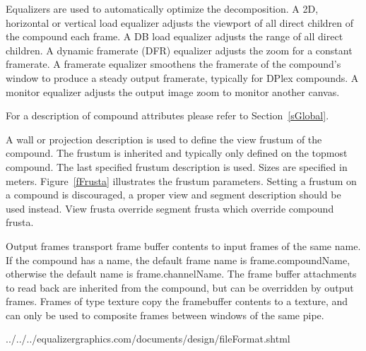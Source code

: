 \documentclass[10pt,a4]{scrartcl}
\newcommand{\fig}[1]{Figure~\ref{#1}}
\newcommand{\sref}[1]{Section~\ref{#1}}
\begin{document}
Equalizers are used to automatically optimize the decomposition. A 2D,
horizontal or vertical load equalizer adjusts the viewport of all direct
children of the compound each frame. A DB load equalizer adjusts the
range of all direct children. A dynamic framerate (DFR) equalizer adjusts
the zoom for a constant framerate. A framerate equalizer
smoothens the framerate of the compound's window to produce a steady
output framerate, typically for DPlex compounds. A monitor equalizer
adjusts the output image zoom to monitor another canvas.

For a description of compound attributes please refer to \sref{sGlobal}.

A wall or projection description is used to define the view frustum of
the compound. The frustum is inherited and typically only defined on the
topmost compound. The last specified frustum description is used. Sizes
are specified in meters. \fig{fFrusta} illustrates the frustum
parameters. Setting a frustum on a compound is discouraged, a proper view and
segment description should be used instead. View frusta override segment frusta
which override compound frusta.

Output frames transport frame buffer contents to input frames of the
same name. If the compound has a name, the default frame name is
\textsf{frame.compoundName}, otherwise the default name is
\textsf{frame.channelName}. The frame buffer attachments to read back
are inherited from the compound, but can be overridden by output
frames. Frames of type \textsf{texture} copy the framebuffer contents to
a texture, and can only be used to composite frames between windows of
the same pipe.

{\footnotesize
  {../../../equalizergraphics.com/documents/design/fileFormat.shtml}}

\end{document}
